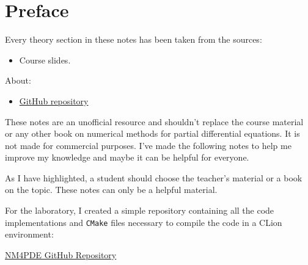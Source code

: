 \section*{Preface}

Every theory section in these notes has been taken from the sources:
\begin{itemize}
    \item Course slides.\cite{numerical-methods-for-partial-differential-equations-polimi}
\end{itemize}
About:
\begin{itemize}
    \item[\faIcon{github}] \href{https://github.com/PoliMI-HPC-E-notes-projects-AndreVale69/HPC-E-PoliMI-university-notes}{GitHub repository}
    \begin{center}
    \end{center}
\end{itemize}
These notes are an unofficial resource and shouldn't replace the course material or any other book on numerical methods for partial differential equations. It is not made for commercial purposes. I've made the following notes to help me improve my knowledge and maybe it can be helpful for everyone.

As I have highlighted, a student should choose the teacher's material or a book on the topic. These notes can only be a helpful material.

\highspace
For the laboratory, I created a simple repository containing all the code implementations and \texttt{CMake} files necessary to compile the code in a CLion environment:
\begin{center}
    \href{https://github.com/PoliMI-HPC-E-notes-projects-AndreVale69/NM4PDE-labs}{NM4PDE GitHub Repository} \hspace{1em} 
\end{center}